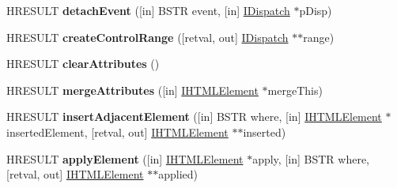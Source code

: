 \begin{DoxyCompactItemize}
\item 
\mbox{\label{interface_m_s_h_t_m_l_1_1_i_h_t_m_l_element2_a36fa4191726b4a4ab9d3214cf820734e}} 
H\+R\+E\+S\+U\+LT {\bfseries detach\+Event} (\mbox{[}in\mbox{]} B\+S\+TR event, \mbox{[}in\mbox{]} \hyperlink{interface_i_dispatch}{I\+Dispatch} $\ast$p\+Disp)
\item 
\mbox{\label{interface_m_s_h_t_m_l_1_1_i_h_t_m_l_element2_a509f805e4ad40dea68a36eba4ddd0888}} 
H\+R\+E\+S\+U\+LT {\bfseries create\+Control\+Range} (\mbox{[}retval, out\mbox{]} \hyperlink{interface_i_dispatch}{I\+Dispatch} $\ast$$\ast$range)
\item 
\mbox{\label{interface_m_s_h_t_m_l_1_1_i_h_t_m_l_element2_a53a3163f055d58a7a5920480f42dd365}} 
H\+R\+E\+S\+U\+LT {\bfseries clear\+Attributes} ()
\item 
\mbox{\label{interface_m_s_h_t_m_l_1_1_i_h_t_m_l_element2_a14d295a77d5096d91749529d55ea1ff6}} 
H\+R\+E\+S\+U\+LT {\bfseries merge\+Attributes} (\mbox{[}in\mbox{]} \hyperlink{interface_m_s_h_t_m_l_1_1_i_h_t_m_l_element}{I\+H\+T\+M\+L\+Element} $\ast$merge\+This)
\item 
\mbox{\label{interface_m_s_h_t_m_l_1_1_i_h_t_m_l_element2_aee933973c308f5e83fae405292f01217}} 
H\+R\+E\+S\+U\+LT {\bfseries insert\+Adjacent\+Element} (\mbox{[}in\mbox{]} B\+S\+TR where, \mbox{[}in\mbox{]} \hyperlink{interface_m_s_h_t_m_l_1_1_i_h_t_m_l_element}{I\+H\+T\+M\+L\+Element} $\ast$inserted\+Element, \mbox{[}retval, out\mbox{]} \hyperlink{interface_m_s_h_t_m_l_1_1_i_h_t_m_l_element}{I\+H\+T\+M\+L\+Element} $\ast$$\ast$inserted)
\item 
\mbox{\label{interface_m_s_h_t_m_l_1_1_i_h_t_m_l_element2_a5e3162c96bb5518d1cc767ab68c07b86}} 
H\+R\+E\+S\+U\+LT {\bfseries apply\+Element} (\mbox{[}in\mbox{]} \hyperlink{interface_m_s_h_t_m_l_1_1_i_h_t_m_l_element}{I\+H\+T\+M\+L\+Element} $\ast$apply, \mbox{[}in\mbox{]} B\+S\+TR where, \mbox{[}retval, out\mbox{]} \hyperlink{interface_m_s_h_t_m_l_1_1_i_h_t_m_l_element}{I\+H\+T\+M\+L\+Element} $\ast$$\ast$applied)
\item 
$$
\end{DoxyCompactItemize}
